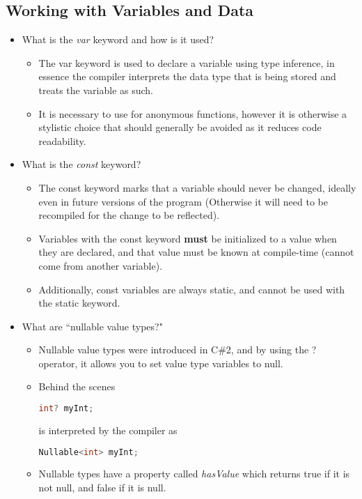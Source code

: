 \documentclass{article}
\begin{document}
\subsection{Working with Variables and Data}
\begin{itemize}
    \item What is the \textit{var} keyword and how is it used?
    \begin{itemize}
        \item The var keyword is used to declare a variable using type inference, in essence the compiler interprets the data type that is being stored and treats the variable as such. 
        \item It is necessary to use for anonymous functions, however it is otherwise a stylistic choice that should generally be avoided as it reduces code readability.
    \end{itemize}
    \item What is the \textit{const} keyword?
    \begin{itemize}
        \item The const keyword marks that a variable should never be changed, ideally even in future versions of the program (Otherwise it will need to be recompiled for the change to be reflected).
        \item Variables with the const keyword \textbf{must} be initialized to a value when they are declared, and that value must be known at compile-time (cannot come from another variable).
        \item Additionally, const variables are always static, and cannot be used with the static keyword.
    \end{itemize}
    \item What are ``nullable value types?"
    \begin{itemize}
        \item Nullable value types were introduced in C\#2, and by using the ? operator, it allows you to set value type variables to null.
        \item Behind the scenes
        \begin{lstlisting}[language=C++]
            int? myInt; \end{lstlisting} is interpreted by the compiler as
            \begin{lstlisting}[language=C++]
            Nullable<int> myInt; \end{lstlisting}
        \item Nullable types have a property called \textit{hasValue} which returns true if it is not null, and false if it is null.

\end{itemize}
\end{itemize}
\end{document}
